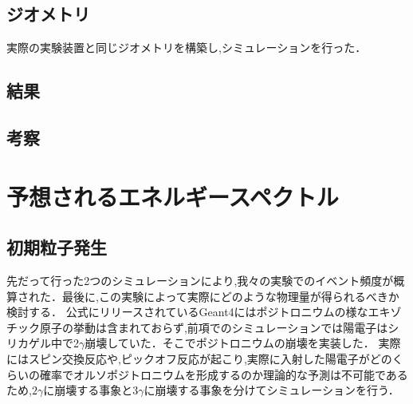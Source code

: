 \subsection{ジオメトリ}
実際の実験装置と同じジオメトリを構築し,シミュレーションを行った．

\subsection{結果}


\subsection{考察}



\section{予想されるエネルギースペクトル}

\subsection{初期粒子発生}
先だって行った2つのシミュレーションにより,我々の実験でのイベント頻度が概算された．最後に,この実験によって実際にどのような物理量が得られるべきか検討する．
公式にリリースされているGeant4にはポジトロニウムの様なエキゾチック原子の挙動は含まれておらず,前項でのシミュレーションでは陽電子はシリカゲル中で2$\gamma$崩壊していた．そこでポジトロニウムの崩壊を実装した．
実際にはスピン交換反応や,ピックオフ反応が起こり,実際に入射した陽電子がどのくらいの確率でオルソポジトロニウムを形成するのか理論的な予測は不可能であるため,$2\gamma$に崩壊する事象と$3\gamma$に崩壊する事象を分けてシミュレーションを行う．
